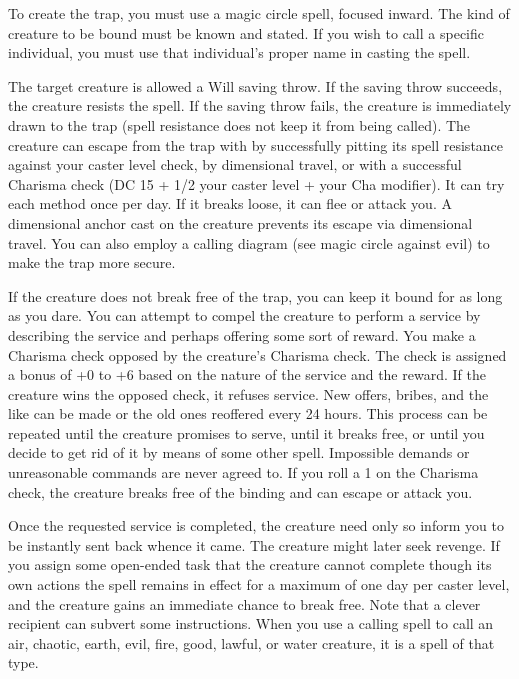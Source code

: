 \begin{multicols}{2}
\begin{small}
\smallskip\noindent To create the trap, you must use a magic circle spell, focused inward. The kind of creature to be bound must be known and stated. If you wish to call a specific individual, you must use that individual's proper name in casting the spell.

\smallskip\noindent The target creature is allowed a Will saving throw. If the saving throw succeeds, the creature resists the spell. If the saving throw fails, the creature is immediately drawn to the trap (spell resistance does not keep it from being called). The creature can escape from the trap with by successfully pitting its spell resistance against your caster level check, by dimensional travel, or with a successful Charisma check (DC 15 + 1/2 your caster level + your Cha modifier). It can try each method once per day. If it breaks loose, it can flee or attack you. A dimensional anchor cast on the creature prevents its escape via dimensional travel. You can also employ a calling diagram (see magic circle against evil) to make the trap more secure.

\smallskip\noindent If the creature does not break free of the trap, you can keep it bound for as long as you dare. You can attempt to compel the creature to perform a service by describing the service and perhaps offering some sort of reward. You make a Charisma check opposed by the creature's Charisma check. The check is assigned a bonus of +0 to +6 based on the nature of the service and the reward. If the creature wins the opposed check, it refuses service. New offers, bribes, and the like can be made or the old ones reoffered every 24 hours. This process can be repeated until the creature promises to serve, until it breaks free, or until you decide to get rid of it by means of some other spell. Impossible demands or unreasonable commands are never agreed to. If you roll a 1 on the Charisma check, the creature breaks free of the binding and can escape or attack you.

\smallskip\noindent Once the requested service is completed, the creature need only so inform you to be instantly sent back whence it came. The creature might later seek revenge. If you assign some open-ended task that the creature cannot complete though its own actions the spell remains in effect for a maximum of one day per caster level, and the creature gains an immediate chance to break free. Note that a clever recipient can subvert some instructions.
When you use a calling spell to call an air, chaotic, earth, evil, fire, good, lawful, or water creature, it is a spell of that type. 


\end{small}
\end{multicols}
